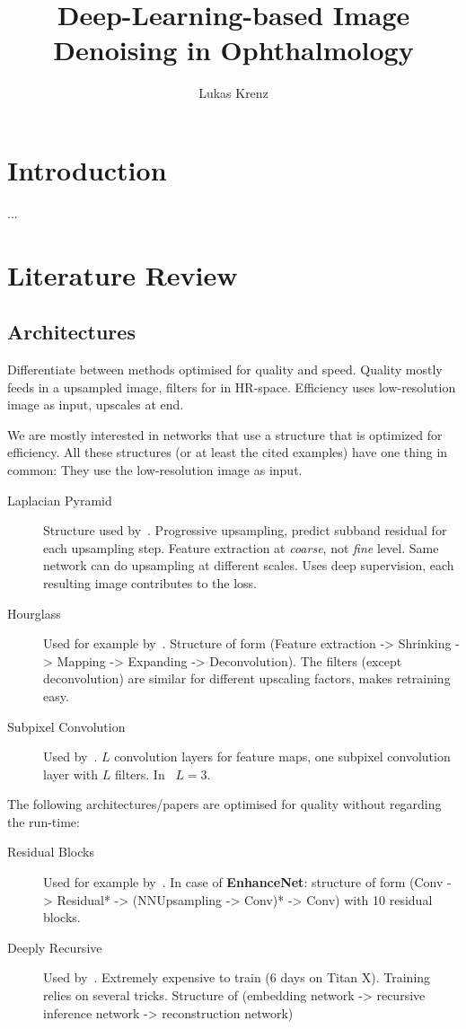 \documentclass{scrartcl}
\begin{document}
\title{Deep-Learning-based Image Denoising in Ophthalmology}
\author{Lukas Krenz}

\maketitle

\section{Introduction}
...

\section{Literature Review}

\subsection{Architectures}
\label{sec:architecturs}
Differentiate between methods optimised for quality and speed.
Quality mostly feeds in a upsampled image, filters for in HR-space.
Efficiency uses low-resolution image as input, upscales at end.

We are mostly interested in networks that use a structure that is optimized for efficiency.
All these structures (or at least the cited examples) have one thing in common:
They use the low-resolution image as input.
\begin{description}
\item[Laplacian Pyramid] Structure used by~\cite{LapSRN}.
  Progressive upsampling, predict subband residual for each upsampling step.
  Feature extraction at \textit{coarse}, not \textit{fine} level.
  Same network can do upsampling at different scales.
  Uses deep supervision, each resulting image contributes to the loss.
\item[Hourglass] Used for example by~\cite{Fsrcnn}.
  Structure of form (Feature extraction -> Shrinking -> Mapping -> Expanding -> Deconvolution).
  The filters (except deconvolution) are similar for different upscaling factors, makes retraining easy.
\item[Subpixel Convolution]  Used by~\cite{Espcn}.
  $L$ convolution layers for feature maps, one subpixel convolution layer with $L$ filters.
  In~\cite{Espcn} $L = 3$.
\end{description}

The following architectures/papers are optimised for quality without regarding the run-time:
\begin{description}
\item[Residual Blocks] Used for example by~\cite{EnhanceNet, SRGAN, EDSR}.
   In case of \textbf{EnhanceNet}: structure of form (Conv -> Residual* -> (NNUpsampling -> Conv)* -> Conv) with 10 residual blocks.
  
\item[Deeply Recursive] Used by~\cite{DRCN}.
  Extremely expensive to train (6 days on Titan X).
  Training relies on several tricks.
  Structure of (embedding network -> recursive inference network -> reconstruction network)
\end{description}
\end{document}
